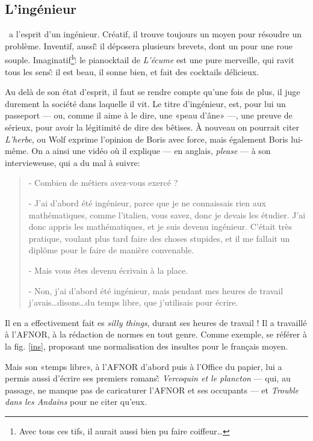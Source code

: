 \subsection{L'ingénieur}

\BV\ a l'esprit d'un ingénieur. Créatif, il trouve toujours
un moyen pour résoudre un problème. Inventif, aussi\~: il déposera
plusieurs brevets, dont un pour une roue souple. Imaginatif\footnote{Avec tous ces tifs,
il aurait aussi bien pu faire coiffeur\ldots}\~: le pianocktail de \emph{L'écume}
est une pure merveille, qui ravit tous les sens\~: il est beau, il sonne bien,
et fait des cocktails délicieux.

Au delà de son état d'esprit, il faut se rendre compte qu'une fois de plus,
il juge durement la société dans laquelle il vit. Le titre d'ingénieur, est,
pour lui un passeport --- ou, comme il aime à le dire, une «peau d'âne» ---, une
preuve de sérieux, pour avoir la légitimité de dire des bêtises. À nouveau on pourrait
citer \emph{L'herbe}, ou Wolf exprime l'opinion de Boris avec force, mais également
Boris lui-même. On a ainsi une vidéo où il explique --- en anglais, \emph{please} ---
à son intervieweuse, qui a du mal à suivre:

{\small
\begin{quotation}
- Combien de métiers avez-vous exercé ?

- J'ai d'abord été ingénieur, parce que je ne connaissais rien aux
mathématiques, comme l'italien, vous savez, donc je devais les étudier.
J'ai donc appris les mathématiques, et je suis devenu ingénieur.
C'était très pratique, voulant plus tard faire des choses stupides,
et il me fallait un diplôme pour le faire de manière convenable.

- Mais vous êtes devenu écrivain à la place.

- Non, j'ai d'abord été ingénieur, mais pendant mes heures de travail
j'avais\ldots disons\ldots du temps libre, que j'utilisais pour écrire.
\end{quotation}
}

Il en a effectivement fait es \emph{silly things}, durant ses heures de travail ! Il a
travaillé à l'AFNOR, à la rédaction de normes en tout genre. Comme exemple, se
référer à la fig. \ref{ins}, proposant une normalisation des insultes pour le français moyen.

Mais son «temps libre», à l'AFNOR d'abord puis à l'Office du papier, lui a permis aussi d'écrire ses premiers romans\~:
\emph{Vercoquin et le plancton} --- qui, au passage, ne manque pas de caricaturer l'AFNOR
et ses occupants --- et \emph{Trouble dans les Andains} pour ne citer qu'eux.

